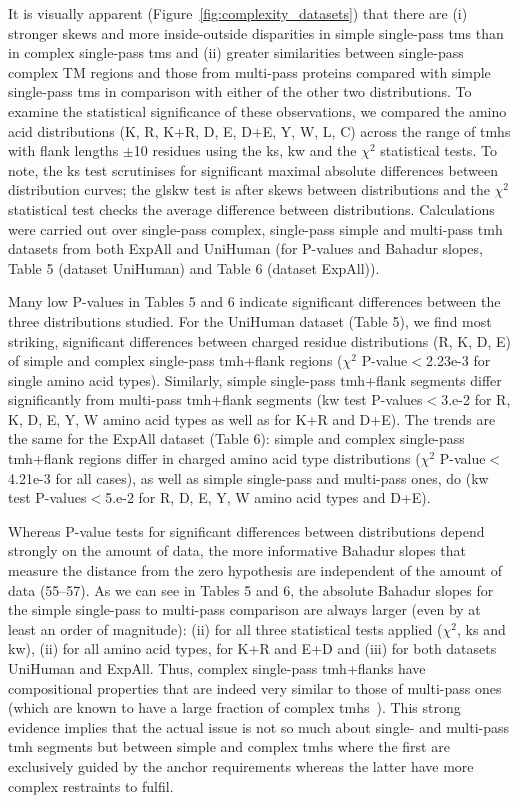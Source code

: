 It is visually apparent (Figure~\ref{fig:complexity_datasets}) that there are (i) stronger skews and more inside-outside disparities in simple single-pass \gls{tm}s than in complex single-pass \gls{tm}s and (ii) greater similarities between single-pass complex TM regions and those from multi-pass proteins compared with simple single-pass \gls{tm}s in comparison with either of the other two distributions. To examine the statistical significance of these observations, we compared the amino acid distributions (K, R, K+R, D, E, D+E, Y, W, L, C) across the range of \gls{tmh}s with flank lengths $\pm$10 residues using the \gls{ks}, \gls{kw} and the \({\chi}^{2}\) statistical tests. To note, the \gls{ks} test scrutinises for significant maximal absolute differences between distribution curves; the gls{kw} test is after skews between distributions and the \({\chi}^{2}\) statistical test checks the average difference between distributions. Calculations were carried out over single-pass complex, single-pass simple and multi-pass \gls{tmh} datasets from both ExpAll and UniHuman (for P-values and Bahadur slopes, Table 5 (dataset UniHuman) and Table 6 (dataset ExpAll)).

Many low P-values in Tables 5 and 6 indicate significant differences between the three distributions studied. For the UniHuman dataset (Table 5), we find most striking, significant differences between charged residue distributions (R, K, D, E) of simple and complex single-pass \gls{tmh}+flank regions (\({\chi}^{2}\) P-value$<$2.23e-3 for single amino acid types). Similarly, simple single-pass \gls{tmh}+flank segments differ significantly from multi-pass \gls{tmh}+flank segments (\gls{kw} test P-values$<$3.e-2 for R, K, D, E, Y, W amino acid types as well as for K+R and D+E). The trends are the same for the ExpAll dataset (Table 6): simple and complex single-pass \gls{tmh}+flank regions differ in charged amino acid type distributions (\({\chi}^{2}\) P-value$<$4.21e-3 for all cases), as well as simple single-pass and multi-pass ones, do (\gls{kw} test P-values$<$5.e-2 for R, D, E, Y, W amino acid types and D+E).

Whereas P-value tests for significant differences between distributions depend strongly on the amount of data, the more informative Bahadur slopes that measure the distance from the zero hypothesis are independent of the amount of data (55--57). As we can see in Tables 5 and 6, the absolute Bahadur slopes for the simple single-pass to multi-pass comparison are always larger (even by at least an order of magnitude): (ii) for all three statistical tests applied (\({\chi}^{2}\), \gls{ks} and \gls{kw}), (ii) for all amino acid types, for K+R and E+D and (iii) for both datasets UniHuman and ExpAll. Thus, complex single-pass \gls{tmh}+flanks have compositional properties that are indeed very similar to those of multi-pass ones (which are known to have a large fraction of complex \gls{tmh}s~\cite{Wong2011, Wong2012}). This strong evidence implies that the actual issue is not so much about single- and multi-pass \gls{tmh} segments but between simple and complex \gls{tmh}s where the first are exclusively guided by the anchor requirements whereas the latter have more complex restraints to fulfil.


